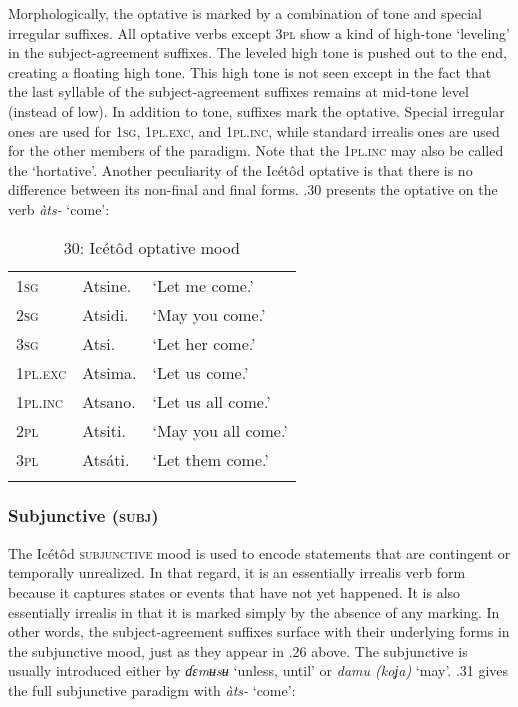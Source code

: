 Morphologically, the optative is marked by a combination of tone and special irregular suffixes. All optative verbs except 3\textsc{pl} show a kind of high-tone ‘leveling’ in the subject-agreement suffixes. The leveled high tone is pushed out to the end, creating a floating high tone. This high tone is not seen except in the fact that the last syllable of the subject-agreement suffixes remains at mid-tone level (instead of low). In addition to tone, suffixes mark the optative. Special irregular ones are used for \textsc{1sg}, 1\textsc{pl.exc}, and 1\textsc{pl.inc}, while standard irrealis ones are used for the other members of the paradigm. Note that the 1\textsc{pl.inc} may also be called the ‘hortative’. Another peculiarity of the Icétôd optative is that there is no difference between its non-final and final forms. .30 presents the optative on the verb \textit{àts-} ‘come’:


\begin{table}
\caption{30: Icétôd optative mood}
\label{tab:8}


\begin{tabularx}{\textwidth}{XXX}
\lsptoprule

\textsc{1sg} & Atsine. & ‘Let me come.’\\
\textsc{2sg} & Atsidi. & ‘May you come.’\\
\textsc{3sg} & Atsi. & ‘Let her come.’\\
\textsc{1pl.exc} & Atsima. & ‘Let us come.’\\
\textsc{1pl.inc} & Atsano. & ‘Let us all come.’\\
\textsc{2pl} & Atsiti. & ‘May you all come.’\\
\textsc{3pl} & Atsáti. & ‘Let them come.’\\
\lspbottomrule
\end{tabularx}
\end{table}

\subsubsection{Subjunctive (\textsc{subj})}

The Icétôd \textsc{subjunctive} mood is used to encode statements that are contingent or temporally unrealized. In that regard, it is an essentially irrealis verb form because it captures states or events that have not yet happened. It is also essentially irrealis in that it is marked simply by the absence of any marking. In other words, the subject-agreement suffixes surface with their underlying forms in the subjunctive mood, just as they appear in .26 above. The subjunctive is usually introduced either by \textit{ɗɛmʉsʉ} ‘unless, until’ or \textit{damu (koʝa)} ‘may’. .31 gives the full subjunctive paradigm with \textit{àts-} ‘come’:


